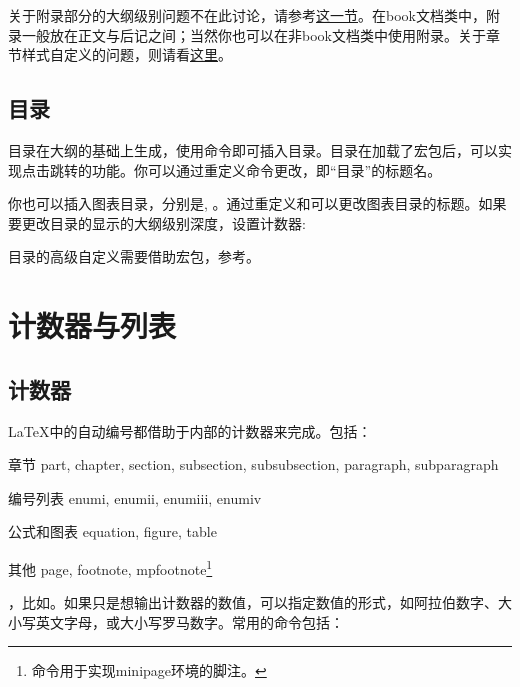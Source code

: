 关于附录部分的大纲级别问题不在此讨论，请参考\hyperref[sec:appendix]{这一节}。在book文档类中，附录一般放在正文与后记之间；当然你也可以在非book文档类中使用附录。关于章节样式自定义的问题，则请看\hyperref[sec:titlesec]{这里}。

\subsection{目录}
目录在大纲的基础上生成，使用命令即可插入目录。目录在加载了宏包后，可以实现点击跳转的功能。你可以通过重定义命令更改，即“目录”的标题名。
\begin{latex}
\renewcommand{\contensname}{目录}
\end{latex}

你也可以插入图表目录，分别是, 。通过重定义和可以更改图表目录的标题。如果要更改目录的显示的大纲级别深度，设置计数器:
\begin{latex}
\setcounter{tocdepth}{2} %
\end{latex}

目录的高级自定义需要借助宏包，参考。

\section{计数器与列表}

\subsection{计数器}
\LaTeX 中的自动编号都借助于内部的计数器来完成。包括：
\begin{fead}
\item[章节] part, chapter, section, subsection, subsubsection, paragraph, subparagraph
\item[编号列表] enumi, enumii, enumiii, enumiv
\item[公式和图表] equation, figure, table
\item[其他] page, footnote, mpfootnote\footnote{命令用于实现minipage环境的脚注。}
\end{fead}

，比如。如果只是想输出计数器的数值，可以指定数值的形式，如阿拉伯数字、大小写英文字母，或大小写罗马数字。常用的命令包括：
\begin{latex}
\Alph \alph \Roman \roman
\end{latex}

